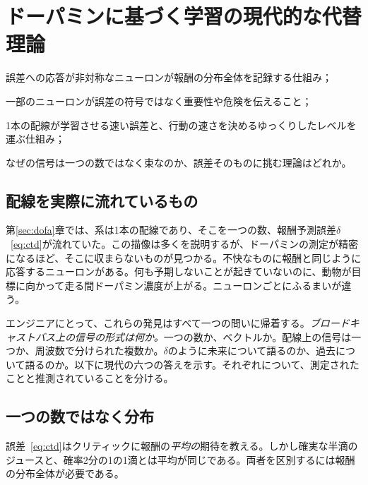 \chapter{ドーパミンに基づく学習の現代的な代替理論}
\label{sec:dofaalt}
\begin{chaptergoals}
\item 誤差への応答が非対称なニューロンが報酬の分布全体を記録する仕組み；
\item 一部のニューロンが誤差の符号ではなく重要性や危険を伝えること；
\item 1本の配線が学習させる速い誤差と、行動の速さを決めるゆっくりしたレベルを運ぶ仕組み；
\item なぜの信号は一つの数ではなく束なのか、誤差そのものに挑む理論はどれか。
\end{chaptergoals}

\section{配線を実際に流れているもの}

第\ref{sec:dofa}章では、系は1本の配線であり、そこを一つの数、報酬予測誤差$\delta$~\eqref{eq:ctd}が流れていた。この描像は多くを説明するが、ドーパミンの測定が精密になるほど、そこに収まらないものが見つかる。不快なものに報酬と同じように応答するニューロンがある。何も予期しないことが起きていないのに、動物が目標に向かって走る間ドーパミン濃度が上がる。ニューロンごとにふるまいが違う。

エンジニアにとって、これらの発見はすべて一つの問いに帰着する。\emph{ブロードキャストバス上の信号の形式は何か。}一つの数か、ベクトルか。配線上の信号は一つか、周波数で分けられた複数か。$\delta$のように未来について語るのか、過去について語るのか。以下に現代の六つの答えを示す。それぞれについて、測定されたことと推測されていることを分ける。

\section{一つの数ではなく分布}

誤差~\eqref{eq:ctd}はクリティックに報酬の\emph{平均の}期待を教える。しかし確実な半滴のジュースと、確率2分の1の1滴とは平均が同じである。両者を区別するには報酬の分布全体が必要である。

